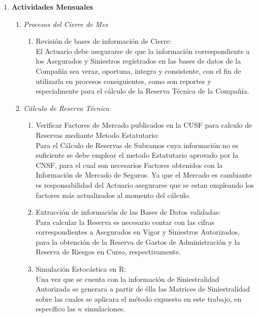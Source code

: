 \documentclass[11pt,twoside,openright,spanish]{report}
\numberwithin{equation}{chapter}
\numberwithin{figure}{chapter}
\numberwithin{table}{chapter}
\begin{document}
\begin{singlespace}
	\begin{enumerate}
		\item \textbf{Actividades Mensuales}
		\begin{enumerate}
			\item \textit{Procesos del Cierre de Mes} \begin{enumerate}
				 	\item Revisión de bases de información de Cierre:
				 	\\ \-\hspace{0.5cm} El Actuario debe asegurarse de que la información correspondiente a los Asegurados y Siniestros registrados en las bases de datos de la Compañía sea veraz, oportuna, integra y consistente, con el fin de utilizarla en procesos consiguientes, como son reportes y especialmente para el cálculo de la Reserva Técnica de la Compañía.\\
				  \end{enumerate}
			\item \textit{ Cálculo de Reserva Técnica}  	\begin{enumerate}
				\item Verificar Factores de Mercado publicados en la CUSF para calculo de Reservas mediante Metodo Estatutario:\\ \-\hspace{0.5cm}
				Para el Cálculo de Reservas de Subramos cuya información no es suficiente se debe emplear el metodo Estatutario aprovado por la CNSF, para el cual son necesarios Factores obtenidos con la Información de Mercado de Seguros. Ya que el Mercado es cambiante es responsabilidad del Actuario asegurarse que se estan empleando los factores más actualizados al momento del cálculo.
				\item Extracción de información de las Bases de Datos validadas:\\ \-\hspace{0.5cm}
				Para calcular la Reserva es necesario contar con las cifras correspondientes a Asegurados en Vigor y Siniestros Autorizados, para la obtención de la Reserva de Gastos de Administración y la Reserva de Riesgos en Curso, respectivamente.				
				\item Simulación Estocástica en R:\\ \-\hspace{0.5cm}
				Una vez que se cuenta con la información de Siniestralidad Autorizada se generara a partir de élla las Matrices de Siniestralidad sobre las cuales se aplicara el método expuesto en este trabajo, en específico las $n$ simulaciones.

\end{enumerate}
\end{enumerate}
\end{enumerate}
\end{singlespace}
\end{document}
